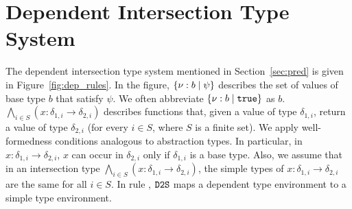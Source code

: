 \section{Dependent Intersection Type System}
\label{sec:dit}

The dependent intersection type system mentioned in 
Section~\ref{sec:pred} 
is given in Figure~\ref{fig:dep_rules}.
In the figure, \(\{\nu:b \mid \psi\}\)
describes the set of values of base type \(b\) that satisfy \(\psi\).
We often abbreviate \(\{\nu:b \mid \mathtt{true}\}\) as \(b\).
\(\bigwedge_{i\in S}(x:\delta_{1,i} \to \delta_{2,i})\) describes 
functions that, given a value of type \(\delta_{1,i}\), return a value of
type \(\delta_{2,i}\) (for every \(i\in S\), where \(S\) is a finite set).
We apply well-formedness conditions analogous to abstraction types. In particular,
in \(x:\delta_{1,i} \to \delta_{2,i}\), \(x\) can occur in \(\delta_{2,i}\) only if
\(\delta_{1,i}\) is a base type. Also, we assume that in an intersection type
\(\bigwedge_{i\in S}(x:\delta_{1,i} \to \delta_{2,i})\), the simple types of
\(x:\delta_{1,i} \to \delta_{2,i}\) are the same for all \(i\in S\).
In rule , \(\texttt{D2S}\) maps a dependent type environment to a simple
type environment.


